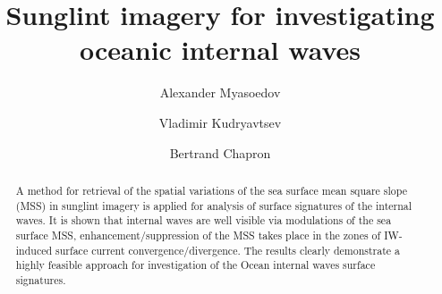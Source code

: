 \documentclass[preprint,authoryear,12pt]{elsarticle}
\begin{document}
\begin{frontmatter}



\title{Sunglint imagery for investigating oceanic internal waves}


\author[solab]{Alexander Myasoedov}

\author[solab]{Vladimir Kudryavtsev}

\author[ifremer,solab]{Bertrand Chapron}


\address[solab]{Satellite Oceanography Laboratoty, Russian State Hydrometeorological University, Malookhtinsky prospect 98, Saint-Petersburg, 195196, Russia}

\address[ifremer]{Institute Francais de Recherche pour l'Exploitation de la Mer, Plouzane, France}

\begin{abstract}

A method for retrieval of the spatial variations of the sea surface mean square slope (MSS) in sunglint imagery is applied for analysis of surface signatures of the internal waves. It is shown that internal waves are well visible via modulations of the sea surface MSS, enhancement/suppression of the MSS takes place in the zones of IW-induced surface current convergence/divergence. The results clearly demonstrate a highly feasible approach for investigation of the Ocean internal waves surface signatures.

\end{abstract}

\begin{keyword}


\end{keyword}

\end{frontmatter}
\end{document}
